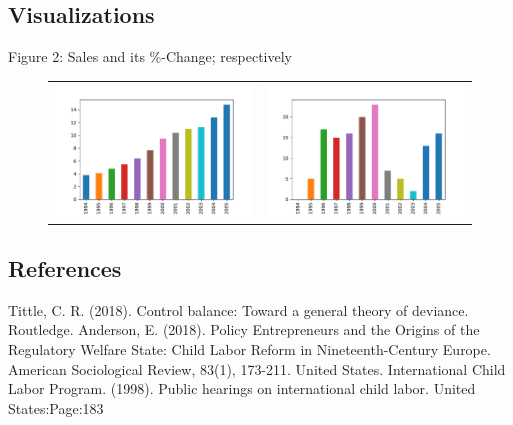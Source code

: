 \documentclass[11pt, a4paper, margin=1in]{IEEEtran}
\begin{document}


\subsection{Visualizations}

Figure 2: Sales and its \%-Change; respectively \\

\begin{figure}[h]
   \centering
   \begin{tabular}{c c}
       \includegraphics[page=1,width=.6\textwidth]{fig.pdf} & 
       \includegraphics[page=1,width=.6\textwidth]{fig2.pdf} \\
   \end{tabular}
\end{figure}

%
%

\subsection{References}
\begin{thebibliography}{9}
    Tittle, C. R. (2018). Control balance: Toward a general theory of deviance. Routledge.
    Anderson, E. (2018). Policy Entrepreneurs and the Origins of the Regulatory Welfare State: Child Labor Reform in Nineteenth-Century Europe. American Sociological Review, 83(1), 173-211.
    United States. International Child Labor Program. (1998). Public hearings on international child labor. United States:Page:183
\end{thebibliography}
\end{document}
